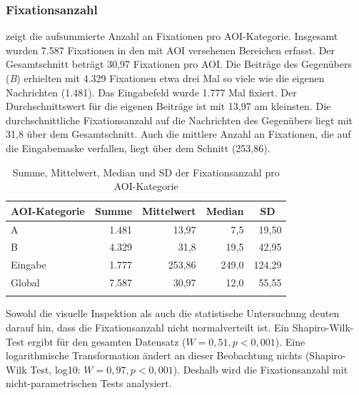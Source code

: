 
\subsubsection{Fixationsanzahl}

\label{K6:subsubsec:fixcount:DD}


 zeigt die aufsummierte Anzahl an Fixationen pro AOI-Ka\-te\-go\-rie. Insgesamt wurden 7.587 Fixationen in den mit AOI versehenen Bereichen erfasst. Der Gesamtschnitt beträgt 30,97 Fixationen pro AOI. Die Beiträge des Gegenübers (\emph{B}) erhielten mit 4.329 Fixationen etwa drei Mal so viele wie die eigenen Nachrichten (1.481). Das Eingabefeld wurde 1.777 Mal fixiert. Der Durchschnittswert für die eigenen Beiträge ist mit 13,97 am kleinsten. Die durchschnittliche Fixationsanzahl auf die Nachrichten des Gegenübers liegt mit 31,8 über dem Gesamtschnitt. Auch die mittlere Anzahl an Fixationen, die auf die Eingabemaske verfallen, liegt über dem Schnitt (253,86).




\begin{table}
    \begin{tabular}{l rrrr}  
    \lsptoprule
        AOI-Kategorie & \multicolumn{1}{c}{Summe} & \multicolumn{1}{c}{Mittelwert} & \multicolumn{1}{c}{Median} & \multicolumn{1}{c}{SD} \\\midrule
        A   & 1.481 & 13,97 & 7,5 & 19,50 \\ 
        B   & 4.329 & 31,8 & 19,5 &  42,95\\ 
        Eingabe   & 1.777 & 253,86 & 249,0 & 124,29 \\ 
        \midrule
        Global  & 7.587 & 30,97 & 12,0 & 55,55\\ 
        \lspbottomrule
    \end{tabular}
            \caption[Summe, Mittelwert, Median und SD der Fixationsanzahl]{Summe, Mittelwert, Median und SD der Fixationsanzahl pro AOI-Kategorie\label{K6:tab:DeDe:mean-sd-fixc}}
\end{table}


Sowohl die visuelle Inspektion als auch die statistische Untersuchung deuten darauf hin, dass die Fixationsanzahl nicht normalverteilt ist. Ein Shapiro-Wilk-Test ergibt für den gesamten Datensatz ($W = 0,51, p < 0,001$). Eine logarithmische Transformation ändert an dieser Beobachtung nichts (Shapiro-Wilk Test, log10: $W = 0,97, p < 0,001$). Deshalb wird die Fixationsanzahl mit nicht-parametrischen Tests analysiert.

